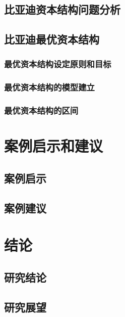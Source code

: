 \section{比亚迪资本结构问题分析}
\section{比亚迪最优资本结构}
\subsection{最优资本结构设定原则和目标}
\subsection{最优资本结构的模型建立}
\subsection{最优资本结构的区间}


\chapter{案例启示和建议}
\section{案例启示}
\section{案例建议}

\chapter{结论}
\section{研究结论}
\section{研究展望}